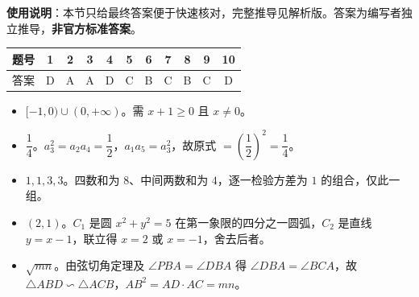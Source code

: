 
\begin{gknotice}
\textbf{使用说明}：本节只给最终答案便于快速核对，完整推导见解析版。答案为编写者独立推导，\textbf{非官方标准答案}。
\end{gknotice}

\begin{center}\begin{tabular}{ccccccccccc}
\toprule
题号 & 1 & 2 & 3 & 4 & 5 & 6 & 7 & 8 & 9 & 10 \\
\midrule
答案 & D & A & A & D & C & B & C & B & C & D \\
\bottomrule
\end{tabular}\end{center}

\begin{itemize}[leftmargin=2.6em]
  \item[\textbf{11.}] $[-1,0)\cup(0,+\infty)$。需 $x+1\geqslant0$ 且 $x\neq0$。
  \item[\textbf{12.}] $\dfrac14$。$a_3^2=a_2a_4=\dfrac12$，$a_1a_5=a_3^2$，故原式 $=\left(\dfrac12\right)^2=\dfrac14$。
  \item[\textbf{13.}] $1,1,3,3$。四数和为 $8$、中间两数和为 $4$，逐一检验方差为 $1$ 的组合，仅此一组。
  \item[\textbf{14.}] $(2,1)$。$C_1$ 是圆 $x^2+y^2=5$ 在第一象限的四分之一圆弧，$C_2$ 是直线 $y=x-1$，联立得 $x=2$ 或 $x=-1$，舍去后者。
  \item[\textbf{15.}] $\sqrt{mn}$。由弦切角定理及 $\angle PBA=\angle DBA$ 得 $\angle DBA=\angle BCA$，故 $\triangle ABD\backsim\triangle ACB$，$AB^2=AD\cdot AC=mn$。
\end{itemize}

